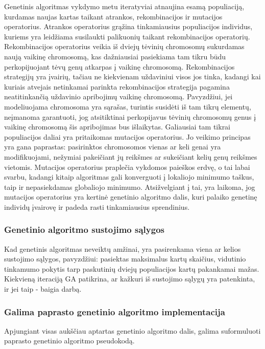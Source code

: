 \documentclass{VUMIFInfKursinis}
\begin{document}
Genetinis algoritmas vykdymo metu iteratyviai atnaujina esamą populiaciją, kurdamas naujas kartas taikant atrankos, rekombinacijos ir mutacijos operatorius.
Atrankos operatorius grąžina tinkamiausius populiacijos individus, kuriems yra leidžiama susilaukti palikuonių taikant rekombinacijos operatorių.
Rekombinacijos operatorius veikia iš dviejų tėvinių chromosomų sukurdamas naują vaikinę chromosomą, kas dažniausiai pasiekiama
tam tikru būdu perkopijuojant tėvų genų atkarpas į vaikinę chromosomą.
Rekombinacijos strategijų yra įvairių, tačiau ne kiekvienam uždaviniui visos jos tinka, kadangi
kai kuriais atvejais netinkamai parinkta rekombinacijos strategija pagamina neatitinkančią uždavinio apribojimų vaikinę chromosomą.
Pavyzdžiui, jei modeliuojama chromosoma yra sąrašas, turintis susidėti iš tam tikrų elementų, neįmanoma garantuoti, jog atsitiktinai
perkopijavus tėvinių chromosomų genus į vaikinę chromosomą šis apribojimas bus išlaikytas.
Galiausiai tam tikrai populiacijos daliai yra pritaikomas mutacijos operatorius.
Jo veikimo principas yra gana paprastas: pasirinktos chromosomos vienas ar keli genai yra modifikuojami,
nežymiai pakeičiant jų reikšmes ar sukeičiant kelių genų reikšmes vietomis.
Mutacijos operatorius praplečia vykdomos paieškos erdvę, o tai labai svarbu, kadangi kitaip algoritmas gali konverguoti
į lokaliojo minimumo taškus, taip ir nepasiekdamas globaliojo minimumo.
Atsižvelgiant į tai, yra laikoma, jog mutacijos operatorius yra kertinė genetinio algoritmo dalis,
kuri palaiko genetinę individų įvairovę ir padeda rasti tinkamiausius sprendinius.

\subsubsection{Genetinio algoritmo sustojimo sąlygos}

Kad genetinis algoritmas neveiktų amžinai, yra pasirenkama viena ar kelios sustojimo sąlygos, pavyzdžiui: pasiektas maksimalus
kartų skaičius, vidutinio tinkamumo pokytis tarp paskutinių dviejų populiacijos kartų pakankamai mažas.
Kiekvieną iteraciją GA patikrina, ar kažkuri iš sustojimo sąlygų yra patenkinta, ir jei taip - baigia darbą.

\subsubsection{Galima paprasto genetinio algoritmo implementacija}

Apjungiant visas aukščiau aptartas genetinio algoritmo dalis, galima suformuluoti paprasto genetinio algoritmo pseudokodą.
\end{document}
